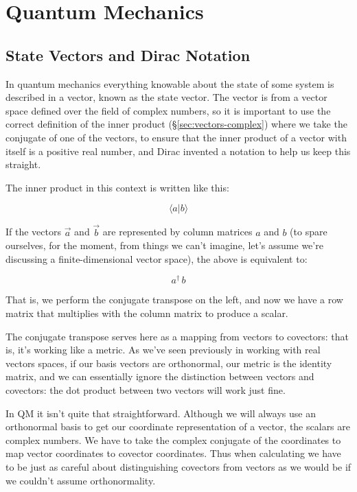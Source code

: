 \chapter{Quantum Mechanics} \label{ch:qm}

\section{State Vectors and Dirac Notation}

In quantum mechanics everything knowable about the state of some system is described in a vector, known as the state vector. The vector is from a vector space defined over the field of complex numbers, so it is important to use the correct definition of the inner product (§\ref{sec:vectors-complex}) where we take the conjugate of one of the vectors, to ensure that the inner product of a vector with itself is a positive real number, and Dirac invented a notation to help us keep this straight.

The inner product in this context is written like this:

$$\langle a|b \rangle$$

If the vectors $\vec{a}$ and $\vec{b}$ are represented by column matrices $a$ and $b$ (to spare ourselves, for the moment, from things we can't imagine, let's assume we're discussing a finite-dimensional vector space), the above is equivalent to:

$$a^{\dagger} \, b$$

That is, we perform the conjugate transpose on the left, and now we have a row matrix that multiplies with the column matrix to produce a scalar.

The conjugate transpose serves here as a mapping from vectors to covectors: that is, it's working like a metric. As we've seen previously in working with real vectors spaces, if our basis vectors are orthonormal, our metric is the identity matrix, and we can essentially ignore the distinction between vectors and covectors: the dot product between two vectors will work just fine.

In QM it isn't quite that straightforward. Although we will always use an orthonormal basis to get our coordinate representation of a vector, the scalars are complex numbers. We have to take the complex conjugate of the coordinates to map vector coordinates to covector coordinates. Thus when calculating we have to be just as careful about distinguishing covectors from vectors as we would be if we couldn't assume orthonormality.

